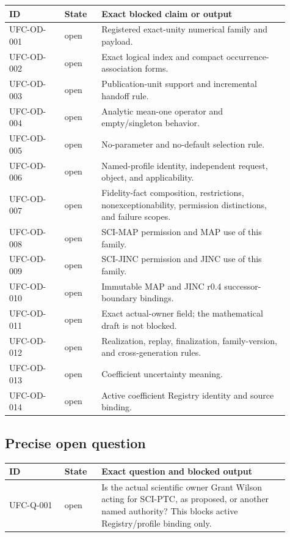 \begin{longtable}{p{0.18\linewidth}p{0.12\linewidth}p{0.61\linewidth}}
\toprule
ID & State & Exact blocked claim or output\\
\midrule
\endhead
UFC-OD-001 & open & Registered exact-unity numerical family and payload.\\
UFC-OD-002 & open & Exact logical index and compact occurrence-association
forms.\\
UFC-OD-003 & open & Publication-unit support and incremental handoff rule.\\
UFC-OD-004 & open & Analytic mean-one operator and empty/singleton behavior.\\
UFC-OD-005 & open & No-parameter and no-default selection rule.\\
UFC-OD-006 & open & Named-profile identity, independent request, object, and
applicability.\\
UFC-OD-007 & open & Fidelity-fact composition, restrictions,
nonexceptionability, permission distinctions, and failure scopes.\\
UFC-OD-008 & open & SCI-MAP permission and MAP use of this family.\\
UFC-OD-009 & open & SCI-JINC permission and JINC use of this family.\\
UFC-OD-010 & open & Immutable MAP and JINC r0.4 successor-boundary
bindings.\\
UFC-OD-011 & open & Exact actual-owner field; the mathematical draft is not
blocked.\\
UFC-OD-012 & open & Realization, replay, finalization, family-version, and
cross-generation rules.\\
UFC-OD-013 & open & Coefficient uncertainty meaning.\\
UFC-OD-014 & open & Active coefficient Registry identity and source binding.\\
\bottomrule
\end{longtable}

\subsection*{Precise open question}

\begin{center}
\begin{tabular}{p{0.18\linewidth}p{0.12\linewidth}p{0.61\linewidth}}
\toprule
ID & State & Exact question and blocked output\\
\midrule
UFC-Q-001 & open & Is the actual scientific owner Grant Wilson acting for
SCI-PTC, as proposed, or another named authority? This blocks active
Registry/profile binding only.\\
\bottomrule
\end{tabular}
\end{center}

\fi
